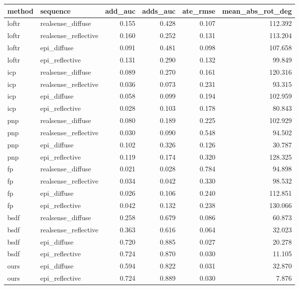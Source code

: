 \begin{tabular}{llrrrr}
\toprule
method & sequence & add_auc & adds_auc & ate_rmse & mean_abs_rot_deg \\
\midrule
loftr & realsense_diffuse & 0.155 & 0.428 & 0.107 & 112.392 \\
loftr & realsense_reflective & 0.160 & 0.252 & 0.131 & 113.204 \\
loftr & epi_diffuse & 0.091 & 0.481 & 0.098 & 107.658 \\
loftr & epi_reflective & 0.131 & 0.290 & 0.132 & 99.849 \\
icp & realsense_diffuse & 0.089 & 0.270 & 0.161 & 120.316 \\
icp & realsense_reflective & 0.036 & 0.073 & 0.231 & 93.315 \\
icp & epi_diffuse & 0.058 & 0.099 & 0.194 & 102.959 \\
icp & epi_reflective & 0.028 & 0.103 & 0.178 & 80.843 \\
pnp & realsense_diffuse & 0.080 & 0.189 & 0.225 & 102.929 \\
pnp & realsense_reflective & 0.030 & 0.090 & 0.548 & 94.502 \\
pnp & epi_diffuse & 0.102 & 0.326 & 0.126 & 30.787 \\
pnp & epi_reflective & 0.119 & 0.174 & 0.320 & 128.325 \\
fp & realsense_diffuse & 0.021 & 0.028 & 0.784 & 94.898 \\
fp & realsense_reflective & 0.034 & 0.042 & 0.330 & 98.532 \\
fp & epi_diffuse & 0.026 & 0.106 & 0.240 & 112.851 \\
fp & epi_reflective & 0.042 & 0.132 & 0.238 & 130.066 \\
bsdf & realsense_diffuse & 0.258 & 0.679 & 0.086 & 60.873 \\
bsdf & realsense_reflective & 0.363 & 0.616 & 0.064 & 32.023 \\
bsdf & epi_diffuse & 0.720 & 0.885 & 0.027 & 20.278 \\
bsdf & epi_reflective & 0.724 & 0.870 & 0.030 & 11.105 \\
ours & epi_diffuse & 0.594 & 0.822 & 0.031 & 32.870 \\
ours & epi_reflective & 0.724 & 0.889 & 0.030 & 7.876 \\
\bottomrule
\end{tabular}
